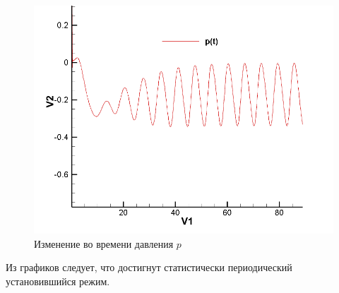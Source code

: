 \documentclass[12pt, a4paper]{article}
\begin{document}
\begin{figure}[H]
    \centering
    \includegraphics[scale=0.5]{figure/p(t).png}
    \caption{Изменение во времени давления $p$}
    \label{fig:my_labe6}
\end{figure}
Из графиков следует, что достигнут статистически периодический установившийся режим.

\newpage
\end{document}

